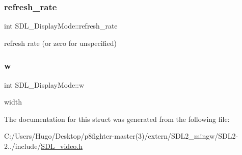 \subsubsection{\texorpdfstring{refresh\+\_\+rate}{refresh\_rate}}
{\footnotesize\ttfamily int S\+D\+L\+\_\+\+Display\+Mode\+::refresh\+\_\+rate}

refresh rate (or zero for unspecified) \mbox{\label{struct_s_d_l___display_mode_a504bb5e21950b719a0df43be51199046}} 
\subsubsection{\texorpdfstring{w}{w}}
{\footnotesize\ttfamily int S\+D\+L\+\_\+\+Display\+Mode\+::w}

width 

The documentation for this struct was generated from the following file\+:\begin{DoxyCompactItemize}
\item 
C\+:/\+Users/\+Hugo/\+Desktop/p8fighter-\/master(3)/extern/\+S\+D\+L2\+\_\+mingw/\+S\+D\+L2-\/2../include/\hyperlink{_s_d_l__video_8h}{S\+D\+L\+\_\+video.\+h}\end{DoxyCompactItemize}
